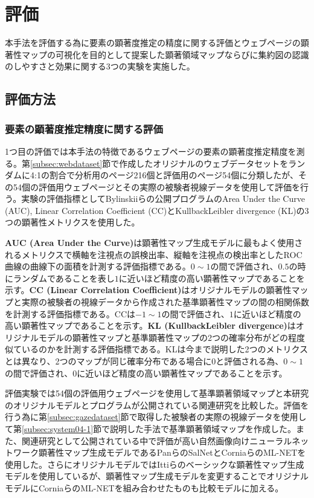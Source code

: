 \newpage
\renewcommand{\baselinestretch}{1.5}
\section{評価}\label{sec:evaluation}
\renewcommand{\baselinestretch}{1}
\par 本手法を評価する為に要素の顕著度推定の精度に関する評価とウェブページの顕著性マップの可視化を目的として提案した顕著領域マップならびに集約図の認識のしやすさと効果に関する3つの実験を実施した。

\subsection{評価方法}
\subsubsection{要素の顕著度推定精度に関する評価}
\par 1つ目の評価では本手法の特徴であるウェブページの要素の顕著度推定精度を測る。第\ref{subsec:webdataset}節で作成したオリジナルのウェブデータセットをランダムに4:1の割合で分析用のページ216個と評価用のページ54個に分類したが、その54個の評価用ウェブページとその実際の被験者視線データを使用して評価を行う。実験の評価指標としてBylinskiiらの公開プログラム\cite{salMetrics_Bylinskii}のArea Under the Curve (AUC), Linear Correlation Coefficient (CC)とKullback\-Leibler divergence (KL)の3つの顕著性メトリクスを使用した。

\par {\bf AUC (Area Under the Curve)}は顕著性マップ生成モデルに最もよく使用されるメトリクスで横軸を注視点の誤検出率、縦軸を注視点の検出率としたROC曲線の曲線下の面積を計測する評価指標である。$0\sim1$の間で評価され、$0.5$の時にランダムであることを表し$1$に近いほど精度の高い顕著性マップであることを示す。{\bf CC (Linear Correlation Coefficient)}はオリジナルモデルの顕著性マップと実際の被験者の視線データから作成された基準顕著性マップの間の相関係数を計測する評価指標である。CCは$-1\sim1$の間で評価され、$1$に近いほど精度の高い顕著性マップであることを示す。{\bf KL (Kullback\-Leibler divergence)}はオリジナルモデルの顕著性マップと基準顕著性マップの2つの確率分布がどの程度似ているのかを計測する評価指標である。KLは今まで説明した2つのメトリクスとは異なり、2つのマップが同じ確率分布である場合に$0$と評価される為、$0\sim1$の間で評価され、$0$に近いほど精度の高い顕著性マップであることを示す。

\par 評価実験では54個の評価用ウェブページを使用して基準顕著領域マップと本研究のオリジナルモデルとプログラムが公開されている関連研究を比較した。評価を行う為に第\ref{subsec:gazedataset}節で取得した被験者の実際の視線データを使用して第\ref{subsec:system04-1}節で説明した手法で基準顕著領域マップを作成した。また、関連研究として公開されている中で評価が高い自然画像向けニューラルネットワーク顕著性マップ生成モデルであるPanらのSalNet\cite{pan2016shallow}とCorniaらのML-NET\cite{mlnet2016}を使用した。さらにオリジナルモデルではIttiらのベーシックな顕著性マップ生成モデル\cite{itti1998model}を使用しているが、顕著性マップ生成モデルを変更することでオリジナルモデルにCorniaらのML-NET\cite{mlnet2016}を組み合わせたものも比較モデルに加える。


